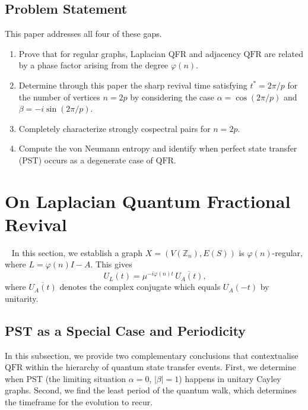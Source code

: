 \documentclass[12pt]{amsart}
\newcommand{\QFR}{\mathrm{QFR}}
\begin{document}
\subsection{Problem Statement}
This paper addresses all four of these gaps.
\begin{enumerate}
    \item Prove that for regular graphs, Laplacian QFR
and adjacency $\QFR$ are related by a phase factor arising from the degree $\varphi(n)$.
\item Determine through this paper the sharp 
revival time satisfying $t^* = 2\pi/p$ for the number of vertices $n = 2p$ by considering the case  $\alpha = \cos(2\pi/p)$ and
$\beta = -i\sin(2\pi/p)$.
\item Completely characterize
strongly cospectral pairs for $n = 2p$. 
\item Compute
the von Neumann entropy and identify when perfect state transfer (PST) occurs as a degenerate
case of $\QFR$.
\end{enumerate} 


\section{On Laplacian Quantum Fractional Revival}~\label{secreval}
In this section, we establish a graph $X = (V(\mathbb{Z}_n),E(S))$ is $\varphi(n)$-regular, where  $L = \varphi(n)I - A$. This gives
\begin{equation}~\label{eqq01Laplacian}
  U_L(t)=\mu^{-i\varphi(n)t}\, \overline{U_A(t)},
\end{equation}
where $\overline{U_A(t)}$ denotes the complex conjugate which equals $U_A(-t)$ by unitarity.

\subsection{PST as a Special Case and Periodicity} 
In this subsection, we provide two complementary conclusions that contextualise $\QFR$ within the hierarchy of quantum state transfer events. First, we determine when PST (the limiting situation $\alpha = 0$, $|\beta| = 1$) happens in unitary Cayley graphs. Second, we find the least period of the quantum walk, which determines the timeframe for the evolution to recur.
\end{document}
